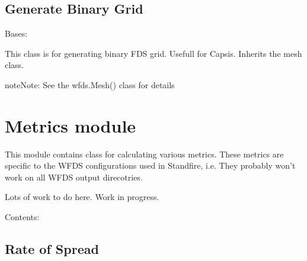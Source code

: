 \documentclass[letterpaper,10pt,english]{sphinxmanual}
\begin{document}
\subsection{Generate Binary Grid}
\label{wfds_GenerateBinaryGrid::doc}\label{wfds_GenerateBinaryGrid:generate-binary-grid}

\begin{fulllineitems}
\label{wfds_GenerateBinaryGrid:wfds.GenerateBinaryGrid}
Bases: {\hyperref[wfds_Mesh:wfds.Mesh]{}}

This class is for generating binary FDS grid. Usefull for Capsis. Inherits
the mesh class.

\begin{notice}{note}{Note:}
See the wfds.Mesh() class for details
\end{notice}

\end{fulllineitems}



\section{Metrics module}
\label{metrics::doc}\label{metrics:metrics-module}\label{metrics:module-metrics}
This module contains class for calculating various metrics. These metrics are
specific to the WFDS configurations used in Standfire, i.e. They probably won't
work on all WFDS output direcotries.

Lots of work to do here. Work in progress.

Contents:


\subsection{Rate of Spread}
\label{metrics_ROS::doc}\label{metrics_ROS:rate-of-spread}
\end{document}
